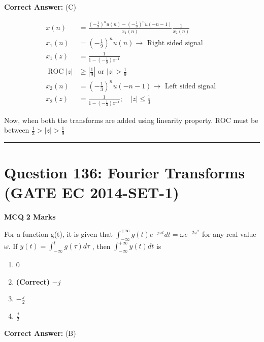 \documentclass[11pt,a4paper]{article}
\begin{document}
\noindent \textbf{Correct Answer:} (C)

\begin{tcolorbox}[solbox, title=Detailed Solution -- Question 135]
\[
\begin{aligned} x(n) &=\frac{\left(-\frac{1}{9}\right)^{n} u(n)-\left(-\frac{1}{3}\right)^{n} u(-n-1)}{x_{1}(n)} \frac{1}{x_{2}(n)} \\ x_{1}(n) &=\left(-\frac{1}{9}\right)^{n} u(n) \rightarrow \text { Right sided signal } \\ x_{1}(z) &=\frac{1}{1-\left(-\frac{1}{9}\right) z^{-1}} \\ \operatorname{ROC}|z| & \geq\left|\frac{1}{9}\right| \text { or }|z|>\frac{1}{9} \\ x_{2}(n) &=\left(-\frac{1}{3}\right)^{n} u(-n-1) \rightarrow \text { Left sided signal } \\ x_{2}(z) &=\frac{1}{1-\left(-\frac{1}{3}\right) z^{-1}} ; \quad|z| \leq \frac{1}{3} \end{aligned}
\]

 Now, when both the transforms are added using linearity property.
 ROC must be between 
$\frac{1}{3}>|z|>\frac{1}{9}$
\end{tcolorbox}

\vspace{1.5em}
\hrule
\vspace{1.5em}

\section*{Question 136: Fourier Transforms (GATE EC 2014-SET-1)}
\noindent \textbf{\color{primary}MCQ} \hfill \textbf{\color{secondary}2 Marks}


\noindent For a function g(t), it is given that $\int_{-\infty }^{+\infty }g(t)e^{-j\omega t}dt=\omega e^{-2\omega ^{2}}$ for any real value $\omega$. If $y(t)=\int_{-\infty }^{t}g(\tau)d\tau$ , then $\int_{-\infty }^{+\infty }y(t)dt$ is


\begin{enumerate}[label=(\Alph*)]
    \item 0
    \item \textbf{(Correct)} $-j$
    \item $-\frac{j}{2}$
    \item $\frac{j}{2}$
\end{enumerate}

\noindent \textbf{Correct Answer:} (B)
\end{document}
